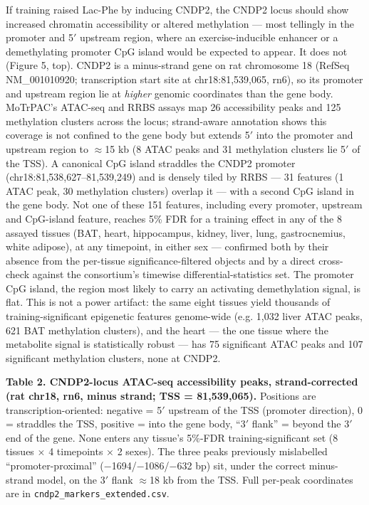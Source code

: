 \documentclass[11pt]{article}
\begin{document}
If training raised Lac-Phe by inducing CNDP2, the CNDP2 locus should show increased
chromatin accessibility or altered methylation --- most tellingly in the promoter and 5$'$
upstream region, where an exercise-inducible enhancer or a demethylating promoter CpG island
would be expected to appear. It does not (Figure 5, top). CNDP2 is a minus-strand gene on
rat chromosome 18 (RefSeq NM\_001010920; transcription start site at chr18:81,539,065, rn6),
so its promoter and upstream region lie at \textit{higher} genomic coordinates than the gene
body. MoTrPAC's ATAC-seq and RRBS assays map 26 accessibility peaks and 125 methylation
clusters across the locus; strand-aware annotation shows this coverage is not confined to the
gene body but extends 5$'$ into the promoter and upstream region to $\approx$15 kb (8 ATAC
peaks and 31 methylation clusters lie 5$'$ of the TSS). A canonical CpG island straddles the
CNDP2 promoter (chr18:81,538,627--81,539,249) and is densely tiled by RRBS
--- 31 features (1 ATAC peak, 30 methylation clusters) overlap it --- with a second CpG island
in the gene body. Not one of these 151 features, including every promoter, upstream and
CpG-island feature, reaches 5\% FDR for a training effect in any of the 8 assayed tissues
(BAT, heart, hippocampus, kidney, liver, lung, gastrocnemius, white adipose), at any
timepoint, in either sex --- confirmed both by their absence from the per-tissue
significance-filtered objects and by a direct cross-check against the consortium's timewise
differential-statistics set. The promoter CpG island, the region most likely to carry an
activating demethylation signal, is flat. This is not a power artifact: the same eight tissues
yield thousands of training-significant epigenetic features genome-wide (e.g. 1,032 liver ATAC
peaks, 621 BAT methylation clusters), and the heart --- the one tissue where the metabolite
signal is statistically robust --- has 75 significant ATAC peaks and 107 significant
methylation clusters, none at CNDP2.

\textbf{Table 2. CNDP2-locus ATAC-seq accessibility peaks, strand-corrected (rat chr18, rn6, minus strand; TSS = 81,539,065).} Positions are transcription-oriented: negative = 5$'$ upstream of the TSS (promoter direction), 0 = straddles the TSS, positive = into the gene body, ``3$'$ flank'' = beyond the 3$'$ end of the gene. None enters any tissue's 5\%-FDR training-significant set (8 tissues $\times$ 4 timepoints $\times$ 2 sexes). The three peaks previously mislabelled ``promoter-proximal'' ($-$1694/$-$1086/$-$632 bp) sit, under the correct minus-strand model, on the 3$'$ flank $\approx$18 kb from the TSS. Full per-peak coordinates are in \texttt{cndp2\_markers\_extended.csv}.
\end{document}
